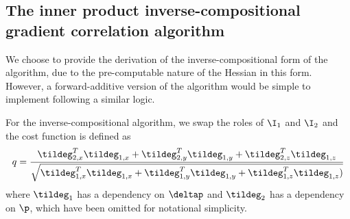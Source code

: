 \subsection{The inner product inverse-compositional gradient correlation algorithm}\label{subsec:3deucinvcomp}
We choose to provide the derivation of the inverse-compositional form of the algorithm, due to the pre-computable nature of the Hessian in this form. However, a forward-additive version of the algorithm would be simple to implement following a similar logic.

For the inverse-compositional algorithm, we swap the roles of $\I_1$ and $\I_2$ and the cost function is defined as
\begin{equation}\label{eq:eucinvcomp}
    q = \frac{\tildeg_{2,x}^T \tildeg_{1,x} + \tildeg_{2,y}^T \tildeg_{1,y} + \tildeg_{2,z}^T \tildeg_{1,z}}{\sqrt{\tildeg_{1,x}^T \tildeg_{1,x} + \tildeg_{1,y}^T \tildeg_{1,y} + \tildeg_{1,z}^T \tildeg_{1,z})}}
\end{equation}
where $\tildeg_1$ has a dependency on $\deltap$ and $\tildeg_2$ has a dependency on $\p$, which have been omitted for notational simplicity.

